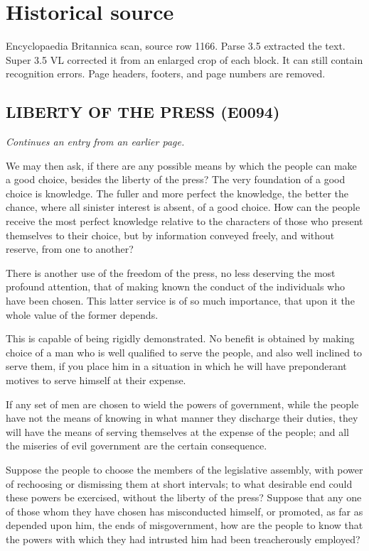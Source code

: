 \documentclass{article}
\begin{document}
\section*{Historical source}
Encyclopaedia Britannica scan, source row 1166. Parse 3.5 extracted the text. Super 3.5 VL corrected it from an enlarged crop of each block. It can still contain recognition errors.
Page headers, footers, and page numbers are removed.

\subsection*{LIBERTY OF THE PRESS (E0094)}
\textit{Continues an entry from an earlier page.}

We may then ask, if there are any possible means by which the people can make a good choice, besides the liberty of the press? The very foundation of a good choice is knowledge. The fuller and more perfect the knowledge, the better the chance, where all sinister interest is absent, of a good choice. How can the people receive the most perfect knowledge relative to the characters of those who present themselves to their choice, but by information conveyed freely, and without reserve, from one to another?

There is another use of the freedom of the press, no less deserving the most profound attention, that of making known the conduct of the individuals who have been chosen. This latter service is of so much importance, that upon it the whole value of the former depends.

This is capable of being rigidly demonstrated. No benefit is obtained by making choice of a man who is well qualified to serve the people, and also well inclined to serve them, if you place him in a situation in which he will have preponderant motives to serve himself at their expense.

If any set of men are chosen to wield the powers of government, while the people have not the means of knowing in what manner they discharge their duties, they will have the means of serving themselves at the expense of the people; and all the miseries of evil government are the certain consequence.

Suppose the people to choose the members of the legislative assembly, with power of rechoosing or dismissing them at short intervals; to what desirable end could these powers be exercised, without the liberty of the press? Suppose that any one of those whom they have chosen has misconducted himself, or promoted, as far as depended upon him, the ends of misgovernment, how are the people to know that the powers with which they had intrusted him had been treacherously employed?
\end{document}
